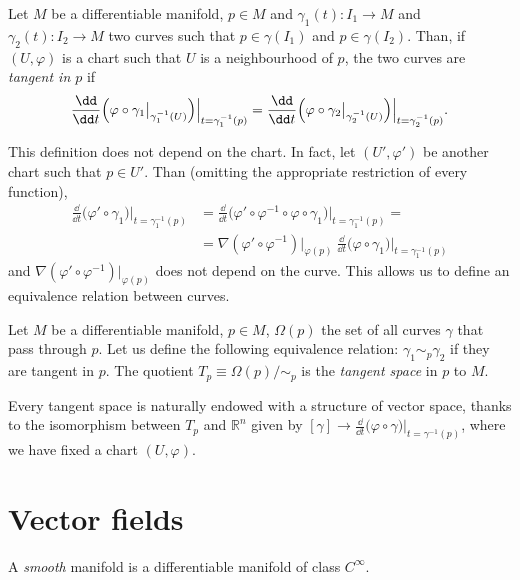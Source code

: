 \documentclass[a4paper,12pt]{book}
\begin{document}
\begin{definition}
Let $M$ be a differentiable manifold, $p\in M$ and $\gamma_1(t)\colon I_1\to M$ and $\gamma_2(t)\colon I_2\to M$ two curves such that $p\in\gamma(I_1)$ and $p\in\gamma(I_2)$. Than, if $(U,\varphi)$ is a chart such that $U$ is a neighbourhood of $p$, the two curves are \emph{tangent in $p$} if
\[\frac{\dd}{\dd t}\Bigl(\varphi\circ\gamma_1\big|_{\gamma_1^{-1}(U)}\Bigr)\Big|_{t=\gamma_1^{-1}(p)}=\frac{\dd}{\dd t}\Bigl(\varphi\circ\gamma_2\big|_{\gamma_2^{-1}(U)}\Bigr)\Big|_{t=\gamma_2^{-1}(p)}.\]
\end{definition}
This definition does not depend on the chart. In fact, let $(U',\varphi')$ be another chart such that $p\in U'$. Than (omitting the appropriate restriction of every function),
\[
\begin{split}
\frac{\dd}{\dd t}\bigl(\varphi'\circ\gamma_1\bigr)\Big|_{t=\gamma_1^{-1}(p)}&=\frac{\dd}{\dd t}\bigl(\varphi'\circ\varphi^{-1}\circ\varphi\circ\gamma_1\bigr)\Big|_{t=\gamma_1^{-1}(p)}=\\
&=\nabla(\varphi'\circ\varphi^{-1})\Big|_{\varphi(p)}\ \frac{\dd}{\dd t}\bigl(\varphi\circ\gamma_1\bigr)\Big|_{t=\gamma_1^{-1}(p)}
\end{split}
\]
and $\nabla(\varphi'\circ\varphi^{-1})\big|_{\varphi(p)}$ does not depend on the curve. This allows us to define an equivalence relation between curves.

\begin{definition}
Let $M$ be a differentiable manifold, $p\in M$, $\Omega(p)$ the set of all curves $\gamma$ that pass through $p$. Let us define the following equivalence relation: $\gamma_1\sim_p\gamma_2$ if they are tangent in $p$. The quotient $T_p\equiv\Omega(p)/\sim_p$ is the \emph{tangent space} in $p$ to $M$.
\end{definition}

Every tangent space is naturally endowed with a structure of vector space, thanks to the isomorphism between $T_p$ and $\mathbb R^n$ given by $[\gamma]\to\frac{\dd}{\dd t}\bigl(\varphi\circ\gamma\bigr)\big|_{t=\gamma^{-1}(p)}$, where we have fixed a chart $(U,\varphi)$.

\section{Vector fields}

\begin{definition}
A \emph{smooth} manifold is a differentiable manifold of class $C^\infty$.
\end{definition}
\end{document}
